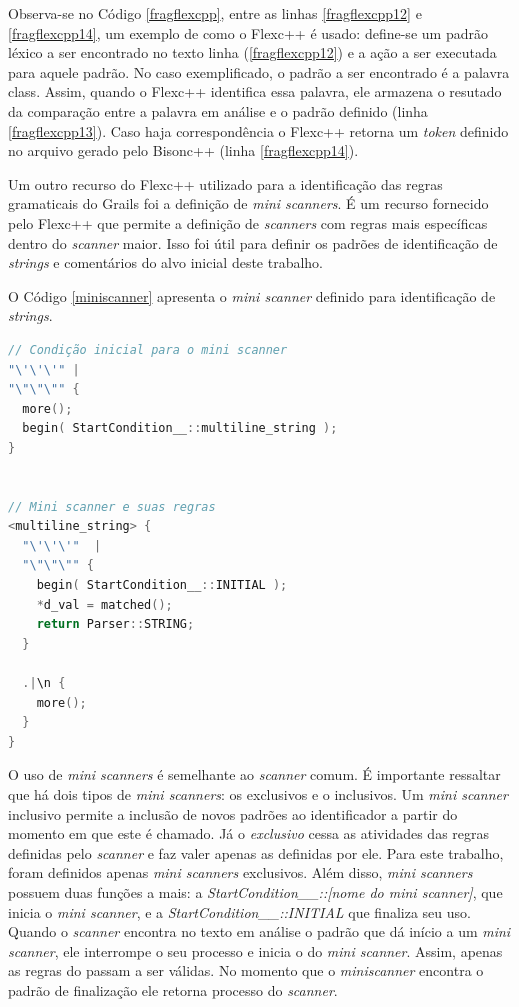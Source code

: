 Observa-se no Código \ref{fragflexcpp}, entre as linhas \ref{fragflexcpp12} e \ref{fragflexcpp14}, um exemplo de como o \textsf{Flexc++} é usado:
define-se um padrão léxico a ser encontrado no texto linha (\ref{fragflexcpp12}) e
a ação a ser executada para aquele padrão. No caso exemplificado, o
padrão a ser encontrado é a palavra \textsf{class}. Assim, quando o Flexc++
identifica essa palavra, ele armazena o resutado da comparação entre a palavra em
análise e o padrão definido (linha \ref{fragflexcpp13}). Caso haja correspondência o
Flexc++ retorna um \textit{token} definido no arquivo gerado pelo
\textsf{Bisonc++} (linha \ref{fragflexcpp14}).

Um outro recurso do \textsf{Flexc++} utilizado para a identificação das regras
gramaticais do \textsf{Grails} foi a definição de \textit{mini scanners}. É um
recurso fornecido pelo \textsf{Flexc++} que permite a definição de \textit{scanners}
com regras mais específicas dentro do \textit{scanner} maior. Isso foi útil para
definir os padrões de identificação de \textit{strings} e comentários do alvo inicial deste trabalho.

O Código \ref{miniscanner} apresenta o \textit{mini scanner} definido para
identificação de \textit{strings}.

\begin{lstlisting}[language=C++, label=miniscanner, caption=Implementação do mini scanner de strings]
// Condição inicial para o mini scanner
"\'\'\'" |
"\"\"\"" {
  more();
  begin( StartCondition__::multiline_string );
}


// Mini scanner e suas regras
<multiline_string> {
  "\'\'\'"  |
  "\"\"\"" {
    begin( StartCondition__::INITIAL );
    *d_val = matched();
    return Parser::STRING;
  }

  .|\n {
    more();
  }
}
\end{lstlisting}

O uso de \textit{mini scanners} é semelhante ao \textit{scanner} comum. É
importante ressaltar que há dois tipos de \textit{mini scanners}: os exclusivos
e o inclusivos. Um \textit{mini scanner} inclusivo permite a inclusão de novos
padrões ao identificador a partir do momento em que este é chamado. Já o
\textit{exclusivo} cessa as atividades das regras definidas pelo \textit{scanner}
e faz valer apenas as definidas por ele. Para este trabalho, foram definidos apenas
\textit{mini scanners} exclusivos. Além disso, \textit{mini scanners} possuem
duas funções a mais: a \textit{StartCondition\_\_::[nome do mini scanner]}, que
inicia o \textit{mini scanner}, e a \textit{StartCondition\_\_::INITIAL} que
finaliza seu uso. Quando o \textit{scanner} encontra no texto em análise o
padrão que dá início a um \textit{mini scanner}, ele interrompe o seu processo e
inicia o do \textit{mini scanner}. Assim, apenas as regras do \miniscanner passam a ser
válidas. No momento que o \textit{miniscanner} encontra o padrão de finalização
ele retorna processo do \textit{scanner}.

